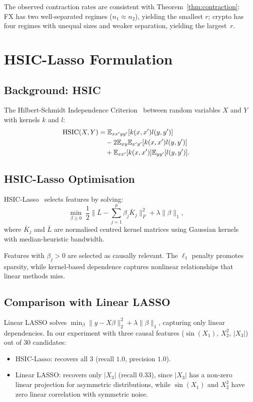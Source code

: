 \documentclass[11pt]{article}
\newcommand{\E}{\mathbb{E}}
\DeclareMathOperator{\HSIC}{HSIC}
\begin{document}
The observed contraction rates are consistent with
Theorem~\ref{thm:contraction}: FX has two well-separated regimes
($n_1 \approx n_2$), yielding the smallest $r$; crypto has four
regimes with unequal sizes and weaker separation, yielding the
largest~$r$.


\section{HSIC-Lasso Formulation}\label{app:hsiclasso}

\subsection{Background: HSIC}

The Hilbert-Schmidt Independence Criterion~\cite{gretton2007kernel}
between random variables $X$ and $Y$ with kernels $k$ and $l$:
\begin{align}
  \HSIC(X, Y) &= \E_{xx'yy'}[k(x,x')l(y,y')] \\
  &\quad - 2\E_{xy}\E_{x'y'}[k(x,x')l(y,y')] \notag \\
  &\quad + \E_{xx'}[k(x,x')]\E_{yy'}[l(y,y')]. \notag
\end{align}

\subsection{HSIC-Lasso Optimisation}

HSIC-Lasso~\cite{yamada2014high} selects features by solving:
\begin{equation}
  \min_{\beta \geq 0} \;\frac{1}{2}
  \bigl\|\bar{L} - \sum_{j=1}^p \beta_j \bar{K}_j \bigr\|_F^2
  + \lambda \|\beta\|_1,
\end{equation}
where $\bar{K}_j$ and $\bar{L}$ are normalised centred kernel matrices
using Gaussian kernels with median-heuristic bandwidth.

Features with $\beta_j > 0$ are selected as causally relevant.  The
$\ell_1$ penalty promotes sparsity, while kernel-based dependence
captures nonlinear relationships that linear methods miss.

\subsection{Comparison with Linear LASSO}

Linear LASSO solves $\min_\beta \|y - X\beta\|_2^2 +
\lambda\|\beta\|_1$, capturing only linear dependencies.  In our
experiment with three causal features ($\sin(X_1)$, $X_2^2$,
$|X_3|$) out of 30 candidates:
\begin{itemize}[nosep]
  \item HSIC-Lasso: recovers all 3 (recall $1.0$, precision $1.0$).
  \item Linear LASSO: recovers only $|X_3|$ (recall $0.33$), since
        $|X_3|$ has a non-zero linear projection for asymmetric
        distributions, while $\sin(X_1)$ and $X_2^2$ have zero
        linear correlation with symmetric noise.
\end{itemize}
\end{document}
